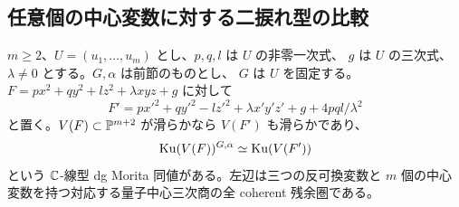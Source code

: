 \subsection{任意個の中心変数に対する二捩れ型の比較}
\label{nsf:sec:general}
\begin{theorem}\label{nsf:thm:all-dimensions}
$m\ge2$、$U=(u_1,\ldots,u_m)$ とし、$p,q,l$ は $U$ の非零一次式、
$g$ は $U$ の三次式、$\lambda\ne0$ とする。$G,\alpha$ は前節のものとし、
$G$ は $U$ を固定する。$F=px^2+qy^2+lz^2+\lambda xyz+g$ に対して
\[
 F'=px'^2+qy'^2-lz'^2+\lambda x'y'z'+g+4pql/\lambda^2
\]
と置く。$V(F)\subset\mathbb P^{m+2}$ が滑らかなら $V(F')$ も滑らかであり、
\[
 \operatorname{Ku}(V(F))^{G,\alpha}\simeq\operatorname{Ku}(V(F'))
\]
という $\mathbb C$-線型 dg Morita 同値がある。左辺は三つの反可換変数と
$m$ 個の中心変数を持つ対応する量子中心三次商の全 coherent 残余圏である。
\end{theorem}
